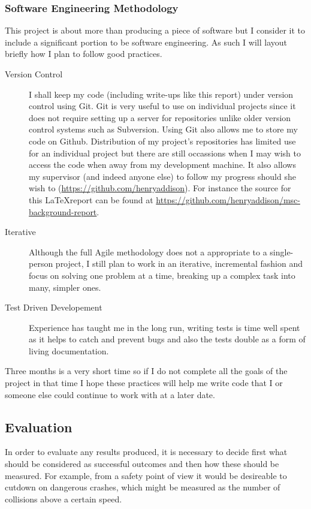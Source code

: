 \subsubsection{Software Engineering Methodology}
This project is about more than producing a piece of software but I
consider it to include a significant portion to be software
engineering.  As such I will layout briefly how I plan to follow good
practices. 

\begin{description}
  \item[Version Control] I shall keep my
code (including write-ups like this report) under version control
using Git. Git is very useful to use on individual projects since it
does not require setting up a server for repositories unlike older
version control systems such as Subversion. Using Git also allows me
to store my code on Github. Distribution of my project's repositories
has limited use for an individual project but there are still
occassions when I may wish to access the code when away from my
development machine. It also allows my supervisor (and indeed anyone
else) to follow my progress should she wish to (\url{https://github.com/henryaddison}).
For instance the source for this \LaTeX  report can be found at
\url{https://github.com/henryaddison/msc-background-report}. 

  \item[Iterative] Although the full Agile methodology does not a appropriate to a single-person
project, I still plan to work in an iterative, incremental fashion and
focus on solving one problem at a time, breaking up a complex
task into many, simpler ones. 

  \item[Test Driven Developement] Experience has taught me in the long run, writing
tests is time well spent as it helps to catch and prevent bugs and
also the tests double as a form of living documentation. 

\end{description}

Three months is a very short time so if I do not complete all the goals of the project in
that time I hope these practices will help me write code that I or someone else
could continue to work with at a later date.

\subsection{Evaluation}
In order to evaluate any results produced, it is necessary to decide
first what should be considered as successful outcomes and then how
these should be measured. For example, from a safety point of view it
would be desireable to cutdown on dangerous crashes, which might be
measured as the number of collisions above a certain speed.
